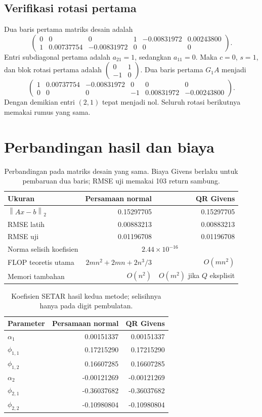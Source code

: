 \documentclass[11pt,a4paper]{article}
\newcommand{\norm}[1]{\left\lVert #1\right\rVert_2}
\numberwithin{equation}{section}
\begin{document}
\subsection*{Verifikasi rotasi pertama}
Dua baris pertama matriks desain adalah
\[
\begin{pmatrix}
0&0&0&1&-0.00831972&0.00243800\\
1&0.00737754&-0.00831972&0&0&0
\end{pmatrix}.
\]
Entri subdiagonal pertama adalah $a_{21}=1$, sedangkan $a_{11}=0$. Maka $c=0$, $s=1$, dan blok rotasi pertama adalah $\left(\begin{smallmatrix}0&1\\-1&0\end{smallmatrix}\right)$. Dua baris pertama $G_1A$ menjadi
\[
\begin{pmatrix}
1&0.00737754&-0.00831972&0&0&0\\
0&0&0&-1&0.00831972&-0.00243800
\end{pmatrix}.
\]
Dengan demikian entri $(2,1)$ tepat menjadi nol. Seluruh rotasi berikutnya memakai rumus yang sama.

\section{Perbandingan hasil dan biaya}
\begin{table}[H]
\centering
\caption{Perbandingan pada matriks desain yang sama. Biaya Givens berlaku untuk pembaruan dua baris; RMSE uji memakai 103 return sambung.}
\begin{tabular}{lrr}
\toprule
Ukuran & Persamaan normal & QR Givens\\
\midrule
$\norm{Ax-b}$ & 0.15297705 & 0.15297705\\
RMSE latih & 0.00883213 & 0.00883213\\
RMSE uji & 0.01196708 & 0.01196708\\
Norma selisih koefisien & \multicolumn{2}{c}{$2.44\times10^{-16}$}\\
FLOP teoretis utama & $2mn^2+2mn+2n^3/3$ & $O(mn^2)$\\
Memori tambahan & $O(n^2)$ & $O(m^2)$ jika $Q$ eksplisit\\
\bottomrule
\end{tabular}
\end{table}

\begin{table}[H]
\centering
\caption{Koefisien SETAR hasil kedua metode; selisihnya hanya pada digit pembulatan.}
\begin{tabular}{lrr}
\toprule
Parameter & Persamaan normal & QR Givens\\
\midrule
$\alpha_1$ & 0.00151337 & 0.00151337\\
$\phi_{1,1}$ & 0.17215290 & 0.17215290\\
$\phi_{1,2}$ & 0.16607285 & 0.16607285\\
$\alpha_2$ & -0.00121269 & -0.00121269\\
$\phi_{2,1}$ & -0.36037682 & -0.36037682\\
$\phi_{2,2}$ & -0.10980804 & -0.10980804\\
\bottomrule
\end{tabular}
\end{table}
\end{document}
